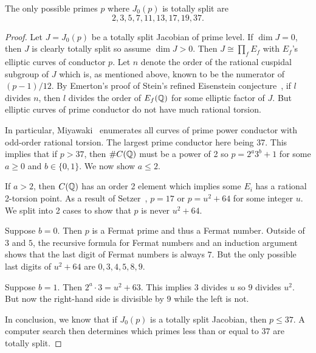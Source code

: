 \begin{lemma}
    \label{lem:good_primes}
    The only possible primes $p$ where $J_0(p)$ is totally split are
    \[
        2, 3, 5, 7, 11, 13, 17, 19, 37.
    \]
\end{lemma}
\begin{proof}
    Let $J=J_0(p)$ be a totally split Jacobian of prime level. If $\dim J=0$,
    then $J$ is clearly totally split so assume $\dim J>0$. Then $J\cong
    \prod_f E_f$ with $E_f$'s elliptic curves of conductor $p$. Let $n$ denote
    the order of the rational cuspidal subgroup of $J$ which is, as mentioned
    above, known to be the numerator of $(p-1)/12$. By Emerton's proof of
    Stein's refined Eisenstein conjecture~\cite[Theorem B]{emerton:optimal}, if
    $l$ divides $n$, then $l$ divides the order of $E_f(\mathbb{Q})$ for some elliptic
    factor of $J$. But elliptic curves of prime conductor do not have much
    rational torsion.

    In particular, Miyawaki~\cite{miyawaki:ell_prime} enumerates all curves of prime
    power conductor with odd-order rational torsion. The largest prime
    conductor here being 37. This implies that if $p>37$, then $\#C(\mathbb{Q})$ must
    be a power of 2 so $p=2^a 3^b + 1$ for some $a\geq 0$ and $b\in \{0,1\}$.
    We now show $a\leq 2$.

    If $a>2$, then $C(\mathbb{Q})$ has an order 2 element which implies some $E_i$ has
    a rational 2-torsion point. As a result of Setzer~\cite[Theorem
    2]{setzer:ell_prime}, $p=17$ or $p=u^2+64$ for some integer $u$. We split into 2
    cases to show that $p$ is never $u^2+64$.

    Suppose $b=0$. Then $p$ is a Fermat prime and thus a Fermat number. Outside
    of $3$ and $5$, the recursive formula for Fermat numbers and an induction
    argument shows that the last digit of Fermat numbers is always $7$. But the
    only possible last digits of $u^2+64$ are $0, 3, 4, 5, 8, 9$.

    Suppose $b=1$. Then $2^a\cdot 3 = u^2+63$. This implies $3$ divides $u$ so
    $9$ divides $u^2$. But now the right-hand side is divisible by $9$ while the
    left is not.

    In conclusion, we know that if $J_0(p)$ is a totally split Jacobian, then $p\leq
    37$. A computer search then determines which primes less than or equal to
    $37$ are totally split.
\end{proof}

